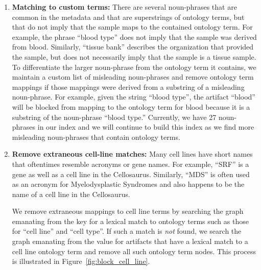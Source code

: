\begin{enumerate}
\item \textbf{Matching to custom terms:} There are several noun-phrases that are common in the metadata and that are superstrings of ontology terms, but that do not imply that the sample maps to the contained ontology term.   For example, the phrase ``blood type'' does not imply that the sample was derived from blood.  Similarly, ``tissue bank'' describes the organization that provided the sample, but does not necessarily imply that the sample is a tissue sample. To differentiate the larger noun-phrase from the ontology term it contains, we maintain a custom list of misleading noun-phrases and remove ontology term mappings if those mappings were derived from a substring of a misleading noun-phrase. For example, given the string ``blood type'', the artifact ``blood'' will be blocked from mapping to the ontology term for blood because it is a substring of the noun-phrase ``blood type.'' Currently, we have 27 noun-phrases in our index and we will continue to build this index as we find more misleading noun-phrases that contain ontology terms.


\item \textbf{Remove extraneous cell-line matches:} 
Many cell lines have short names that oftentimes resemble acronyms or gene names.  For example, ``SRF'' is a gene as well as a cell line in the Cellosaurus. Similarly, ``MDS'' is often used as an acronym for Myelodysplastic Syndromes and also happens to be the name of a cell line in the Cellosaurus.

We remove extraneous mappings to cell line terms by searching the graph emanating from the key for a lexical match to ontology terms such as those for ``cell line'' and ``cell type''.  If such a match is \textit{not} found, we search the graph emanating from the value for artifacts that have a lexical match to a cell line ontology term and remove all such ontology term nodes.  This process is illustrated in Figure~\ref{fig:block_cell_line}.


\end{enumerate}

